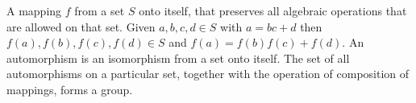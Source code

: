 A mapping $f$ from a set $S$ onto itself, that preserves all algebraic
operations that are allowed on that set.
Given $a,b,c,d \in S$ with $a=bc+d$ then $f(a), f(b), f(c), f(d) \in S
$ and $f(a)=f(b)f(c)+f(d)$.
An automorphism is an isomorphism from a set onto itself.  The set of
all automorphisms on a particular set, together with the operation of
composition of mappings, forms a group.